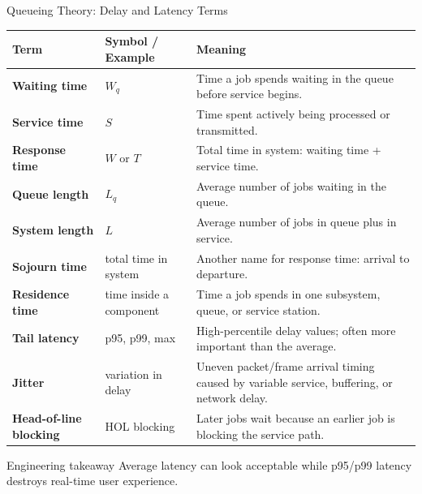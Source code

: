 \documentclass[aspectratio=169]{beamer}
\begin{document}
\begin{frame}{Queueing Theory: Delay and Latency Terms}
\scriptsize

\begin{tabular}{p{2.4cm} p{3.0cm} p{6.5cm}}
\toprule
\textbf{Term} & \textbf{Symbol / Example} & \textbf{Meaning} \\
\midrule
\textbf{Waiting time} & $W_q$ & Time a job spends waiting in the queue before service begins. \\
\textbf{Service time} & $S$ & Time spent actively being processed or transmitted. \\
\textbf{Response time} & $W$ or $T$ & Total time in system: waiting time + service time. \\
\textbf{Queue length} & $L_q$ & Average number of jobs waiting in the queue. \\
\textbf{System length} & $L$ & Average number of jobs in queue plus in service. \\
\textbf{Sojourn time} & total time in system & Another name for response time: arrival to departure. \\
\textbf{Residence time} & time inside a component & Time a job spends in one subsystem, queue, or service station. \\
\textbf{Tail latency} & p95, p99, max & High-percentile delay values; often more important than the average. \\
\textbf{Jitter} & variation in delay & Uneven packet/frame arrival timing caused by variable service, buffering, or network delay. \\
\textbf{Head-of-line blocking} & HOL blocking & Later jobs wait because an earlier job is blocking the service path. \\
\bottomrule
\end{tabular}

\vspace{0.15cm}

\begin{alertblock}{Engineering takeaway}
Average latency can look acceptable while p95/p99 latency destroys real-time user experience.
\end{alertblock}

\end{frame}
\end{document}
